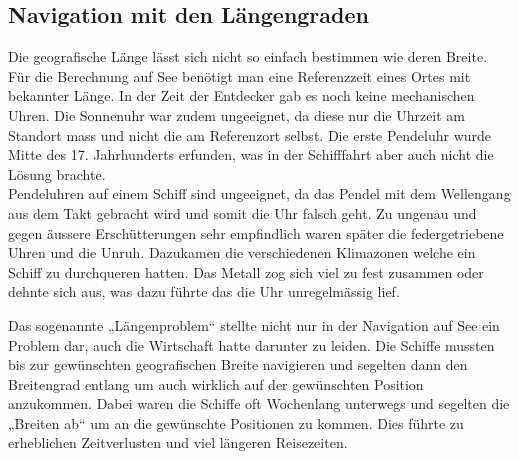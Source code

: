\begin{refsection}
\begin{refsection}
\subsection{Navigation mit den Längengraden}
Die geografische Länge lässt sich nicht so einfach bestimmen wie deren Breite.
Für die Berechnung auf See benötigt man eine Referenzzeit eines Ortes mit bekannter Länge.
In der Zeit der Entdecker gab es noch keine mechanischen Uhren. Die Sonnenuhr war zudem ungeeignet, da diese nur die Uhrzeit am Standort mass und nicht die am Referenzort selbst. Die erste Pendeluhr wurde Mitte des 17. Jahrhunderts erfunden, was in der Schifffahrt aber auch nicht die Lösung brachte.\\
Pendeluhren auf einem Schiff sind ungeeignet, da das Pendel mit dem Wellengang aus dem Takt gebracht wird und somit die Uhr falsch geht.
Zu ungenau und gegen äussere Erschütterungen sehr empfindlich waren später die federgetriebene Uhren und die Unruh. Dazukamen die verschiedenen Klimazonen welche ein Schiff zu durchqueren hatten. Das Metall zog sich viel zu fest zusammen oder dehnte sich aus, was dazu führte das die Uhr unregelmässig lief.

Das sogenannte „Längenproblem“ stellte nicht nur in der Navigation auf See ein Problem dar, auch die Wirtschaft hatte darunter zu leiden. Die Schiffe mussten bis zur gewünschten geografischen Breite navigieren und segelten dann den Breitengrad entlang um auch wirklich auf der gewünschten Position anzukommen. Dabei waren die Schiffe oft Wochenlang unterwegs und segelten die „Breiten ab“ um an die gewünschte Positionen zu kommen. Dies führte zu erheblichen Zeitverlusten und viel längeren Reisezeiten.




\end{refsection}
\end{refsection}
